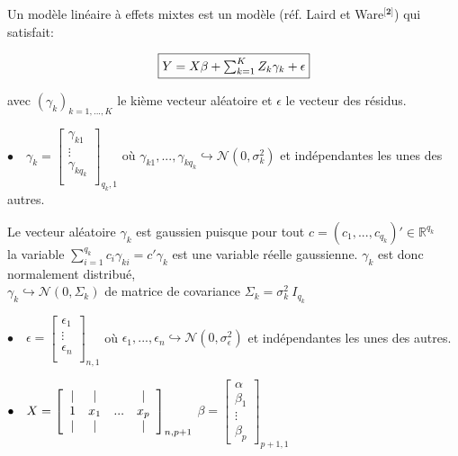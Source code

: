 \documentclass[11pt,fleqn]{book} %
\begin{document}
 \vspace{1em}
 
 Un modèle linéaire à effets mixtes est un modèle (réf. Laird et Ware$^{\textbf{[2]}}$) qui satisfait:

\begin{equation}
\fbox{$
Y=X\beta+\sum_{k=1}^{K} Z_k \gamma_k+\epsilon
$}
\end{equation}

\vspace{1em}

avec $(\gamma_k)_{k=1,...,K}$ le kième vecteur aléatoire et $\epsilon$ le vecteur des résidus.

  \vspace{1em} 
  
$\bullet\quad \gamma_k=\left[
  \begin{array}{ c }
     \gamma_{k1}  \\
     \vdots   \\
     \gamma_{k q_k}  \\ 
  \end{array} \right]_{q_k,1}$  \quad où \: $\gamma_{k1},..., \gamma_{k q_k}\hookrightarrow\mathcal{N}(0,\sigma_k^2)$ \: et indépendantes les unes des autres.

\vspace{1em}
  
  Le vecteur aléatoire $\gamma_k$ est gaussien puisque pour tout $c=(c_1, ... ,c_{q_k})'\in \mathbb{R}^{q_k}$ \\ la variable
  $\sum_{i=1}^{q_k} c_i\gamma_{k i}= c'\gamma_k $ est une variable réelle gaussienne. $\gamma_k$ est donc normalement distribué,\\ 
  $\gamma_k\hookrightarrow\mathcal{N}(0,\Sigma_k)$ de matrice de covariance $\Sigma_k=\sigma_k^2 \: I_{q_k}$ 
  
\vspace{1em}

$\bullet \quad \epsilon=\left[
  \begin{array}{ c }
     \epsilon_{1}  \\
     \vdots   \\
     \epsilon_{n}  \\ 
  \end{array} \right]_{n,1}$  \quad où \: $\epsilon_{1},..., \epsilon_{n}\hookrightarrow\mathcal{N}(0,\sigma_{\epsilon}^2)$ \: et indépendantes les unes des autres.

\vspace{1em}


$\bullet \quad X=\left[
  \begin{array}{ c c c c }
     |  & | & & | \\
     1 & x_1 & ... & x_p  \\
     |  & | & & |
  \end{array} \right]_{n,p+1}$ \quad $\beta=\left[
  \begin{array}{ c }
     \alpha  \\
     \beta_1   \\
      \vdots  \\
      \beta_p  
  \end{array} \right]_{p+1,1} $
  
\end{document}
